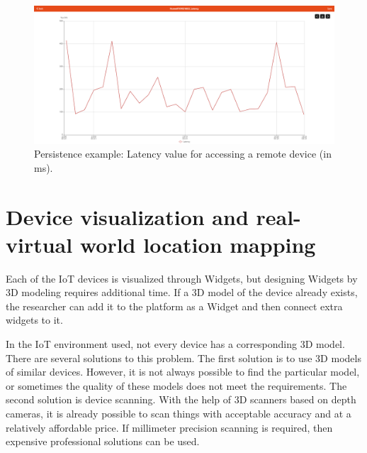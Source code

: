 \begin{figure}
  \centering
  \includegraphics[width=0.9\linewidth]{figures/PersistenceExample.png}
  \caption{Persistence example: Latency value for accessing a remote device (in ms). }
  \label{fig:PersistenceExample-figure}
\end{figure}

\section{Device visualization and real-virtual world location mapping}

Each of the IoT devices is visualized through Widgets, but designing Widgets by 3D modeling requires additional time. If a 3D model of the device already exists, the researcher can add it to the platform as a Widget and then connect extra widgets to it.

In the IoT environment used, not every device has a corresponding 3D model. There are several solutions to this problem. The first solution is to use 3D models of similar devices. However, it is not always possible to find the particular model, or sometimes the quality of these models does not meet the requirements. The second solution is device scanning. With the help of 3D scanners based on depth cameras, it is already possible to scan things with acceptable accuracy and at a relatively affordable price. If millimeter precision scanning is required, then expensive professional solutions can be used.

